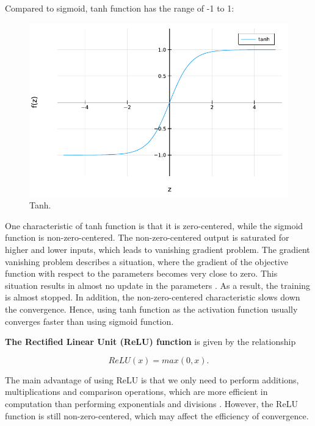 \documentclass[
	parskip, 			   %
	twoside, 			   %
	DIV=14, 			   %
	BCOR=15.0mm, 		   %
	headsepline, 		   %
	open=right, 		   %
	captions=tableheading, %
	bibliography=totoc,    %
	numbers=noenddot       %
]{scrreprt}
\begin{document}
Compared to sigmoid, tanh function has the range of -1 to 1:

\begin{figure}[h!]
    \centering
    \includegraphics[scale=0.6]{figures/tanh.pdf}
    \caption{Tanh.}
    \label{fig:tanh}
\end{figure}

One characteristic of tanh function is that it is zero-centered, while the sigmoid function is non-zero-centered. The non-zero-centered output is saturated for higher and lower inputs, which leads to vanishing gradient problem. The gradient vanishing problem describes a situation, where the gradient of the objective function with respect to the parameters becomes very close to zero. This situation results in almost no update in the parameters \cite{dubey2022activation}. As a result, the training is almost stopped. In addition, the non-zero-centered characteristic slows down the convergence. Hence, using tanh function as the activation function usually converges faster than using sigmoid function.

\textbf{The Rectified Linear Unit (ReLU) function} is given by the relationship

\begin{equation}
    \label{eq:ReLU}
    ReLU(x) = max(0,x).
\end{equation}

The main advantage of using ReLU is that we only need to perform additions, multiplications and comparison operations, which are more efficient in computation than performing exponentials and divisions \cite{nwankpa2018activation}. However, the ReLU function is still non-zero-centered, which may affect the efficiency of convergence. 
\end{document}
